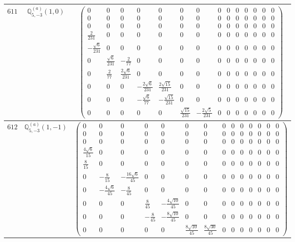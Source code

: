 \documentclass[fleqn,8pt,landscape]{jsarticle}
\begin{document}
\begin{center}
\begin{longtable}{ccc}
$ 611 $ & $ \mathbb{Q}_{5,-3}^{(a)}(1,0) $ & $ \begin{pmatrix} 0 & 0 & 0 & 0 & 0 & 0 & 0 & 0 & 0 & 0 & 0 & 0 & 0 & 0 \\ 0 & 0 & 0 & 0 & 0 & 0 & 0 & 0 & 0 & 0 & 0 & 0 & 0 & 0 \\ 0 & 0 & 0 & 0 & 0 & 0 & 0 & 0 & 0 & 0 & 0 & 0 & 0 & 0 \\ \frac{2}{231} & 0 & 0 & 0 & 0 & 0 & 0 & 0 & 0 & 0 & 0 & 0 & 0 & 0 \\ - \frac{\sqrt{6}}{231} & 0 & 0 & 0 & 0 & 0 & 0 & 0 & 0 & 0 & 0 & 0 & 0 & 0 \\ 0 & \frac{\sqrt{6}}{231} & - \frac{2}{77} & 0 & 0 & 0 & 0 & 0 & 0 & 0 & 0 & 0 & 0 & 0 \\ 0 & \frac{2}{77} & \frac{2 \sqrt{6}}{231} & 0 & 0 & 0 & 0 & 0 & 0 & 0 & 0 & 0 & 0 & 0 \\ 0 & 0 & 0 & - \frac{2 \sqrt{6}}{231} & \frac{2 \sqrt{15}}{231} & 0 & 0 & 0 & 0 & 0 & 0 & 0 & 0 & 0 \\ 0 & 0 & 0 & - \frac{\sqrt{6}}{77} & - \frac{\sqrt{15}}{231} & 0 & 0 & 0 & 0 & 0 & 0 & 0 & 0 & 0 \\ 0 & 0 & 0 & 0 & 0 & \frac{\sqrt{15}}{231} & - \frac{2 \sqrt{5}}{231} & 0 & 0 & 0 & 0 & 0 & 0 & 0 \end{pmatrix} $ \\ \hline
$ 612 $ & $ \mathbb{Q}_{5,-3}^{(a)}(1,-1) $ & $ \begin{pmatrix} 0 & 0 & 0 & 0 & 0 & 0 & 0 & 0 & 0 & 0 & 0 & 0 & 0 & 0 \\ 0 & 0 & 0 & 0 & 0 & 0 & 0 & 0 & 0 & 0 & 0 & 0 & 0 & 0 \\ 0 & 0 & 0 & 0 & 0 & 0 & 0 & 0 & 0 & 0 & 0 & 0 & 0 & 0 \\ \frac{4 \sqrt{6}}{15} & 0 & 0 & 0 & 0 & 0 & 0 & 0 & 0 & 0 & 0 & 0 & 0 & 0 \\ \frac{8}{15} & 0 & 0 & 0 & 0 & 0 & 0 & 0 & 0 & 0 & 0 & 0 & 0 & 0 \\ 0 & - \frac{8}{15} & - \frac{16 \sqrt{6}}{45} & 0 & 0 & 0 & 0 & 0 & 0 & 0 & 0 & 0 & 0 & 0 \\ 0 & - \frac{4 \sqrt{6}}{45} & - \frac{8}{45} & 0 & 0 & 0 & 0 & 0 & 0 & 0 & 0 & 0 & 0 & 0 \\ 0 & 0 & 0 & \frac{8}{45} & - \frac{4 \sqrt{10}}{45} & 0 & 0 & 0 & 0 & 0 & 0 & 0 & 0 & 0 \\ 0 & 0 & 0 & - \frac{8}{45} & - \frac{8 \sqrt{10}}{45} & 0 & 0 & 0 & 0 & 0 & 0 & 0 & 0 & 0 \\ 0 & 0 & 0 & 0 & 0 & \frac{8 \sqrt{10}}{45} & \frac{8 \sqrt{30}}{45} & 0 & 0 & 0 & 0 & 0 & 0 & 0 \end{pmatrix} $ \\ \hline

\end{longtable}
\end{center}
\end{document}
